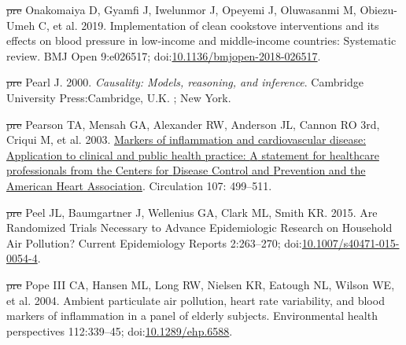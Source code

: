 \documentclass[
  letterpaper,
  DIV=11,
  numbers=noendperiod]{scrartcl}
\newlength{\cslhangindent}
\newenvironment{CSLReferences}[2] %
 {\begin{list}{}{%
  \setlength{\itemindent}{0pt} %
  \setlength{\leftmargin}{0pt} %
  \setlength{\parsep}{0pt} %
  \ifodd #1
   \setlength{\leftmargin}{\cslhangindent} %
   \setlength{\itemindent}{-1\cslhangindent} %
  \fi
  \setlength{\itemsep}{#2\baselineskip}}} %
 {\end{list}} %
\providecommand{\DIFdeltex}[1]{{\protect\color{red}\sout{#1}}}                      %
\providecommand{\DIFaddbegin}{} %
\providecommand{\DIFaddend}{} %
\providecommand{\DIFdelbegin}{} %
\providecommand{\DIFdelend}{} %
\providecommand{\DIFdel}[1]{\texorpdfstring{\DIFdeltex{#1}}{}} %
\newcommand{\DIFscaledelfig}{0.5}
\newlength{\DIFdelgraphicswidth} %
\newlength{\DIFdelgraphicsheight} %
\newcommand{\DIFaddincludegraphics}[2][]{{\color{blue}\fbox{\DIFOincludegraphics[#1]{#2}}}} %
\newcommand{\DIFdelincludegraphics}[2][]{%
\sbox{\DIFdelgraphicsbox}{\DIFOincludegraphics[#1]{#2}}%
\settoboxwidth{\DIFdelgraphicswidth}{\DIFdelgraphicsbox} %
\settoboxtotalheight{\DIFdelgraphicsheight}{\DIFdelgraphicsbox} %
\scalebox{\DIFscaledelfig}{%
\parbox[b]{\DIFdelgraphicswidth}{\usebox{\DIFdelgraphicsbox}\\[-\baselineskip] \rule{\DIFdelgraphicswidth}{0em}}\llap{\resizebox{\DIFdelgraphicswidth}{\DIFdelgraphicsheight}{%
\setlength{\unitlength}{\DIFdelgraphicswidth}%
\begin{picture}(1,1)%
\thicklines\linethickness{2pt} %
{\color[rgb]{1,0,0}\put(0,0){\framebox(1,1){}}}%
{\color[rgb]{1,0,0}\put(0,0){\line( 1,1){1}}}%
{\color[rgb]{1,0,0}\put(0,1){\line(1,-1){1}}}%
\end{picture}%
}\hspace*{3pt}}} %
} %
\DeclareRobustCommand{\DIFaddbegin}{\DIFOaddbegin \let\includegraphics\DIFaddincludegraphics} %
\DeclareRobustCommand{\DIFaddend}{\DIFOaddend \let\includegraphics\DIFOincludegraphics} %
\DeclareRobustCommand{\DIFdelbegin}{\DIFOdelbegin \let\includegraphics\DIFdelincludegraphics} %
\DeclareRobustCommand{\DIFdelend}{\DIFOaddend \let\includegraphics\DIFOincludegraphics} %
\begin{document}
\begin{CSLReferences}{1}{1}
\DIFdelbegin %
\DIFdel{pre}%
\DIFdelend \DIFaddbegin {}
\DIFaddend Onakomaiya D, Gyamfi J, Iwelunmor J, Opeyemi J, Oluwasanmi M,
Obiezu-Umeh C, et al. 2019. Implementation of clean cookstove
interventions and its effects on blood pressure in low-income and
middle-income countries: Systematic review. BMJ Open 9:e026517;
doi:\href{https://doi.org/10.1136/bmjopen-2018-026517}{10.1136/bmjopen-2018-026517}.

\DIFdelbegin %
\DIFdel{pre}%
\DIFdelend \DIFaddbegin {}
\DIFaddend Pearl J. 2000. \emph{Causality: Models, reasoning, and inference}.
Cambridge University Press:Cambridge, U.K. ; New York.

\DIFdelbegin %
\DIFdel{pre}%
\DIFdelend \DIFaddbegin {}
\DIFaddend Pearson TA, Mensah GA, Alexander RW, Anderson JL, Cannon RO 3rd, Criqui
M, et al. 2003.
\href{https://www.ncbi.nlm.nih.gov/pubmed/12551878}{Markers of
inflammation and cardiovascular disease: Application to clinical and
public health practice: {A} statement for healthcare professionals from
the {Centers} for {Disease Control} and {Prevention} and the {American
Heart Association}}. Circulation 107: 499--511.

\DIFdelbegin %
\DIFdel{pre}%
\DIFdelend \DIFaddbegin {}
\DIFaddend Peel JL, Baumgartner J, Wellenius GA, Clark ML, Smith KR. 2015. Are
{Randomized Trials Necessary} to {Advance Epidemiologic Research} on
{Household Air Pollution}? Current Epidemiology Reports 2:263--270;
doi:\href{https://doi.org/10.1007/s40471-015-0054-4}{10.1007/s40471-015-0054-4}.

\DIFdelbegin %
\DIFdel{pre}%
\DIFdelend \DIFaddbegin {}
\DIFaddend Pope III CA, Hansen ML, Long RW, Nielsen KR, Eatough NL, Wilson WE, et
al. 2004. Ambient particulate air pollution, heart rate variability, and
blood markers of inflammation in a panel of elderly subjects.
Environmental health perspectives 112:339--45;
doi:\href{https://doi.org/10.1289/ehp.6588}{10.1289/ehp.6588}.


\end{CSLReferences}
\end{document}
